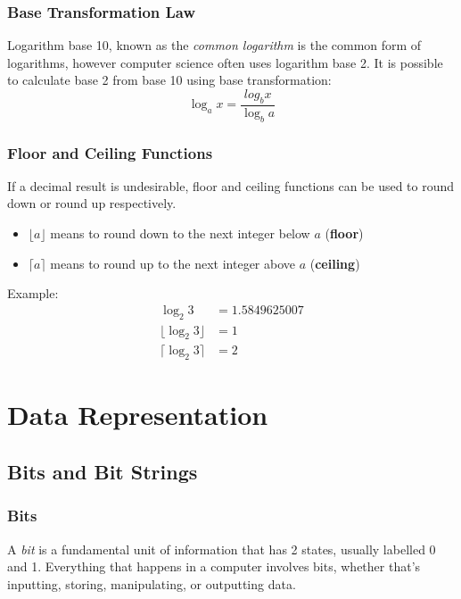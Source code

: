 \documentclass{article}
\begin{document}
\subsubsection{Base Transformation Law}
Logarithm base 10, known as the \emph{common logarithm} is the common form of logarithms,
however computer science often uses logarithm base 2.
It is possible to calculate base 2 from base 10 using base transformation:
\[\log_a x = \frac{log_b x}{\log_b a}\]
%
\newpage
\subsubsection{Floor and Ceiling Functions}
If a decimal result is undesirable,
floor and ceiling functions can be used to round down or round up respectively.
\begin{itemize}
    \item \(\lfloor a \rfloor\) means to round down to the next integer below \(a\) (\textbf{floor})
    \item \(\lceil a \rceil\) means to round up to the next integer above \(a\) (\textbf{ceiling})
\end{itemize}
Example:
\begin{align*}
    \log_2 3 &= 1.5849625007 \\
    \lfloor \log_2 3 \rfloor &= 1 \\
    \lceil \log_2 3 \rceil &= 2
\end{align*}

\newpage
\section{Data Representation}
\subsection{Bits and Bit Strings}
\subsubsection{Bits}
A \emph{bit} is a fundamental unit of information that has 2 states,
usually labelled 0 and 1.
Everything that happens in a computer involves bits,
whether that's inputting, storing, manipulating, or outputting data.
%
\end{document}
